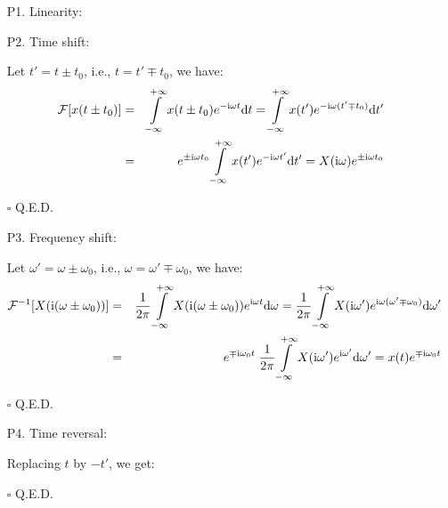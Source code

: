 	\begin{itemize}
	
	\item[P1.] Linearity:
	
	
	\item[P2.] Time shift:
	
	\begin{dem} Let $t'=t\pm t_0$, i.e., $t = t' \mp t_0$, we have:
	\begin{eqnarray}
	{\cal F}[x(t \pm t_0)]&=&\int\limits_{-\infty}^{+\infty} x(t\pm t_0)
		e^{-\mathrm{i}\omega t} \mathrm{d}t
		=\int\limits_{-\infty}^{+\infty} x(t')e^{-\mathrm{i}\omega(t'\mp t_0)} \mathrm{d}t'
		\nonumber \\
		&=& e^{\pm \mathrm{i}\omega t_0}
		\int\limits_{-\infty}^{+\infty} x(t')e^{-\mathrm{i}\omega t'} \mathrm{d}t'=X(\mathrm{i}\omega)e^{\pm \mathrm{i}\omega t_0}
		\nonumber
	\end{eqnarray}
	\begin{flushright}
		$\square$  Q.E.D.
	\end{flushright}
	\end{dem}
	
	\item[P3.] Frequency shift:
	
	\begin{dem} Let $\omega'=\omega\pm \omega_0$, i.e., $\omega = \omega'\mp\omega_0$,
	we have:
	\begin{eqnarray}
	{\cal F}^{-1}[X(\mathrm{i}(\omega \pm \omega_0))]
	&=&\frac{1}{2\pi}\int\limits_{-\infty}^{+\infty} X(\mathrm{i}(\omega\pm \omega_0))
		e^{\mathrm{i}\omega t} \mathrm{d}\omega
	=\frac{1}{2\pi}\int\limits_{-\infty}^{+\infty} X(\mathrm{i}\omega')e^{\mathrm{i}\omega(\omega'\mp \omega_0)}\mathrm{d}\omega'
		\nonumber \\
	&=& e^{\mp \mathrm{i}\omega_0 t}\;\frac{1}{2\pi}\int\limits_{-\infty}^{+\infty} X(\mathrm{i}\omega')e^{\mathrm{i}\omega'}\mathrm{d}\omega'
		=x(t)e^{\mp \mathrm{i}\omega_0 t}
		\nonumber
	\end{eqnarray}
	\begin{flushright}
		$\square$  Q.E.D.
	\end{flushright}
	\end{dem}
	
	\item[P4.] Time reversal:
	
	\begin{dem}
	
	Replacing $t$ by $-t'$, we get:
	
	\begin{flushright}
		$\square$  Q.E.D.
	\end{flushright}
	\end{dem}
	

\end{itemize}
